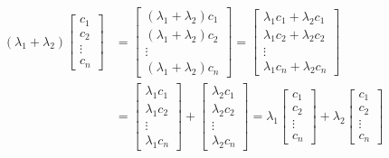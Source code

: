 \documentclass{article}
\begin{document}
\begin{align*}
    (\lambda_1+\lambda_2)\begin{bmatrix}
        c_1 \\
        c_2\\
        \vdots\\
        c_n
    \end{bmatrix}&=\begin{bmatrix}
        (\lambda_1+\lambda_2)c_1 \\
        (\lambda_1+\lambda_2)c_2\\
        \vdots\\
        (\lambda_1+\lambda_2)c_n
    \end{bmatrix}=\begin{bmatrix}
        \lambda_1c_1+\lambda_2c_1 \\
        \lambda_1c_2+\lambda_2c_2\\
        \vdots\\
        \lambda_1c_n+\lambda_2c_n
    \end{bmatrix}\\
    &=\begin{bmatrix}
        \lambda_1 c_1 \\
        \lambda_1 c_2\\
        \vdots\\
        \lambda_1 c_n
    \end{bmatrix}+\begin{bmatrix}
        \lambda_2 c_1 \\
        \lambda_2 c_2\\
        \vdots\\
        \lambda_2 c_n
    \end{bmatrix}=\lambda_1\begin{bmatrix}
        c_1 \\
        c_2\\
        \vdots\\
        c_n
    \end{bmatrix}+\lambda_2\begin{bmatrix}
        c_1 \\
        c_2\\
        \vdots\\
        c_n
    \end{bmatrix}\tag{VS8}
\end{align*}
\end{document}
